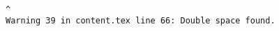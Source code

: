 \begin{tiny}
\begin{verbatim}
                                                                                                                                                                                                                                                                                                                                                                                                                                                                                                                                                                                                                                                                                                                                                                                                                                                                                                                                                                                                                                                                                                                                                                                                                                                                                                                                                                                                                                                                                                                                                                                                                                                                                                                                                                                                       ^
Warning 39 in content.tex line 66: Double space found.

\end{verbatim}
\end{tiny}
